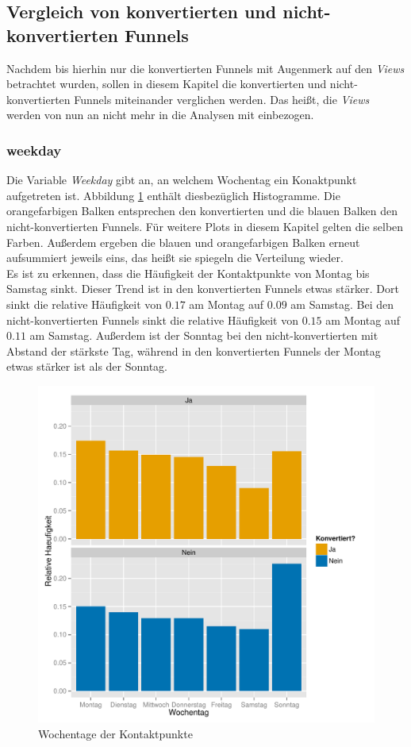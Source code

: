 \subsection{Vergleich von konvertierten und nicht-konvertierten Funnels}

Nachdem bis hierhin nur die konvertierten Funnels mit Augenmerk auf den \textit{Views} betrachtet wurden, sollen in diesem Kapitel die konvertierten und nicht-konvertierten Funnels miteinander verglichen werden. Das heißt, die \textit{Views} werden von nun an nicht mehr in die Analysen mit einbezogen.

\subsubsection*{weekday}
Die Variable \textit{Weekday} gibt an, an welchem Wochentag ein Konaktpunkt aufgetreten ist. Abbildung \ref{weekday} enthält diesbezüglich Histogramme. Die orangefarbigen Balken entsprechen den konvertierten und die blauen Balken den nicht-konvertierten Funnels. Für weitere Plots in diesem Kapitel gelten die selben Farben. Außerdem ergeben die blauen und orangefarbigen Balken erneut aufsummiert jeweils eins, das heißt sie spiegeln die Verteilung wieder.\\
Es ist zu erkennen, dass die Häufigkeit der Kontaktpunkte von Montag bis Samstag sinkt. Dieser Trend ist in den konvertierten Funnels etwas stärker. Dort sinkt die relative Häufigkeit von $ 0.17 $ am Montag auf $ 0.09 $ am Samstag. Bei den nicht-konvertierten Funnels sinkt die relative Häufigkeit von $ 0.15 $ am Montag auf $ 0.11 $ am Samstag. Außerdem ist der Sonntag bei den nicht-konvertierten mit Abstand der stärkste Tag, während in den konvertierten Funnels der Montag etwas stärker ist als der Sonntag.
\begin{figure}[H]
    \centering
    \includegraphics[scale=0.5]{weekday.pdf}
    \caption{Wochentage der Kontaktpunkte}
    \label{weekday}
\end{figure}

